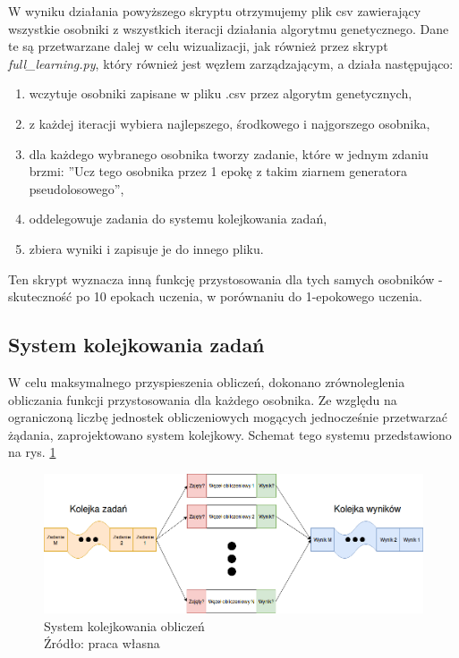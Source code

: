 W wyniku działania powyższego skryptu otrzymujemy plik csv zawierający wszystkie osobniki z wszystkich iteracji działania algorytmu genetycznego.
Dane te są przetwarzane dalej w celu wizualizacji, jak również przez skrypt \textit{full\_learning.py}, który również jest węzłem zarządzającym, a działa następująco:
\begin{enumerate}
  \item wczytuje osobniki zapisane w pliku .csv przez algorytm genetycznych,
  \item z każdej iteracji wybiera najlepszego, środkowego i najgorszego osobnika,
  \item dla każdego wybranego osobnika tworzy zadanie, które w jednym zdaniu brzmi: ''Ucz tego osobnika przez 1 epokę z takim ziarnem generatora pseudolosowego'',
  \item oddelegowuje zadania do systemu kolejkowania zadań,
  \item zbiera wyniki i zapisuje je do innego pliku.
\end{enumerate}
Ten skrypt wyznacza inną funkcję przystosowania dla tych samych osobników - skuteczność po 10 epokach uczenia, w porównaniu do 1-epokowego uczenia.

\subsection{System kolejkowania zadań}\label{sec:queue_system}
W celu maksymalnego przyspieszenia obliczeń, dokonano zrównoleglenia obliczania funkcji przystosowania dla każdego osobnika.
Ze względu na ograniczoną liczbę jednostek obliczeniowych mogących jednocześnie przetwarzać żądania, zaprojektowano system kolejkowy.
Schemat tego systemu przedstawiono na rys. \ref{fig:queue_system}
\begin{figure}[h!tb]
	 \centering
	 \includegraphics[width = 1.1\linewidth]{img/kolejkowanie}
	 \caption{System kolejkowania obliczeń \\
              Źródło: praca własna}
	 \label{fig:queue_system}
\end{figure}

